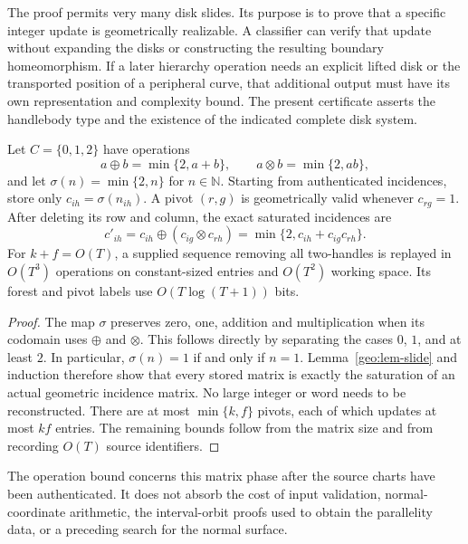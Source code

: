 \begin{remark}
\label{geo:rem-geometric-existence}
The proof permits very many disk slides.  Its purpose is to prove that a
specific integer update is geometrically realizable.  A classifier can
verify that update without expanding the disks or constructing the
resulting boundary homeomorphism.  If a later hierarchy operation needs an
explicit lifted disk or the transported position of a peripheral curve,
that additional output must have its own representation and complexity
bound.  The present certificate asserts the handlebody type and the
existence of the indicated complete disk system.
\end{remark}

\begin{proposition}
\label{geo:prop-saturation}
Let $C=\{0,1,2\}$ have operations
\[
 a\mathbin{\oplus}b=\min\{2,a+b\},\qquad
 a\mathbin{\otimes}b=\min\{2,ab\},
\]
and let $\sigma(n)=\min\{2,n\}$ for $n\in\mathbb N$.
Starting from authenticated incidences, store only $c_{ih}=\sigma(n_{ih})$.
A pivot $(r,g)$ is geometrically valid whenever $c_{rg}=1$.  After deleting
its row and column, the exact saturated incidences are
\[
 c'_{ih}
 =c_{ih}\mathbin{\oplus}(c_{ig}\mathbin{\otimes}c_{rh})
 =\min\{2,c_{ih}+c_{ig}c_{rh}\}.
 \tag{G3}\label{geo:eq-capped-pivot}
\]
For $k+f=O(T)$, a supplied sequence removing all two-handles is replayed in
$O(T^3)$ operations on constant-sized entries and $O(T^2)$ working space.
Its forest and pivot labels use $O(T\log(T+1))$ bits.
\end{proposition}

\begin{proof}
The map $\sigma$ preserves zero, one, addition and multiplication when its
codomain uses $\oplus$ and $\otimes$.  This follows directly by separating
the cases $0$, $1$, and at least $2$.  In particular,
$\sigma(n)=1$ if and only if $n=1$.  Lemma~\ref{geo:lem-slide} and induction
therefore show that every stored matrix is exactly the saturation of an
actual geometric incidence matrix.  No large integer or word needs to be
reconstructed.  There are at most $\min\{k,f\}$ pivots, each of which
updates at most $kf$ entries.  The remaining bounds follow from the matrix
size and from recording $O(T)$ source identifiers.
\end{proof}

The operation bound concerns this matrix phase after the source charts
have been authenticated.  It does not absorb the cost of input validation,
normal-coordinate arithmetic, the interval-orbit proofs used to obtain the
parallelity data, or a preceding search for the normal surface.

